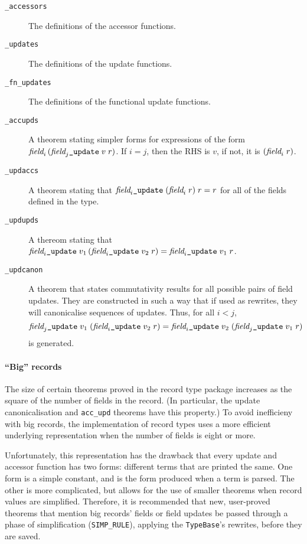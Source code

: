 \begin{description}
\item[\texttt{\_accessors}] The definitions of the accessor functions.
  \rewruse
\item[\texttt{\_updates}] The definitions of the update functions.
  \rewruse
\item[\texttt{\_fn\_updates}] The definitions of the functional update
  functions.
\item[\texttt{\_accupds}] A theorem stating simpler forms for
  expressions of the form $\mbox{\it field}_{i}\, (\mbox{\it field}_{j}\mbox{\tt\_update}\;v\; r)$.  If
  $i = j$, then the RHS is $v$, if not, it is $(\mbox{\it field}_{i}\;r)$.
  \rewruse
\item[\texttt{\_updaccs}] A theorem stating that $\mbox{\it field}_{i}\mbox{\tt\_update}
  \;(\mbox{\it field}_{i}\;r)\;r = r$ for all of
  the fields defined in the type. \rewruse
\item[\texttt{\_updupds}] A thereom stating that $\mbox{\it field}_{i}\mbox{\tt\_update}
  \;v_1 \,(\mbox{\it field}_{i}\mbox{\tt\_update} \;v_2\;r) = \mbox{\it field}_{i}\mbox{\tt\_update}\;v_1\;r$.
  \rewruse
\item[\texttt{\_updcanon}] A theorem that states commutativity results
  for all possible pairs of field updates.  They are constructed in
  such a way that if used as rewrites, they will canonicalise
  sequences of updates. Thus, for all $i < j$, \[
  \mbox{\it field}_{j}\mbox{\tt\_update}\;v_1\;(\mbox{\it field}_{i}\mbox{\tt\_update}\;v_2\;r) =
  \mbox{\it field}_{i}\mbox{\tt\_update}\;v_2\;(\mbox{\it field}_{j}\mbox{\tt\_update}\;v_1\;r)
  \] is generated.
 \rewruse
\end{description}

\paragraph{``Big'' records} The size of certain theorems proved in the
record type package increases as the square of the number of fields in
the record.  (In particular, the update canonicalisation and
\texttt{acc\_upd} theorems have this property.) To avoid inefficieny
with big records, the implementation of record types uses a more
efficient underlying representation when the number of fields is eight
or more.

Unfortunately, this representation has the drawback that every update
and accessor function has two forms: different terms that are printed
the same.  One form is a simple constant, and is the form produced
when a term is parsed.  The other is more complicated, but allows for
the use of smaller theorems when record values are simplified.
Therefore, it is recommended that new, user-proved theorems that
mention big records' fields or field updates be passed through a phase
of simplification (\texttt{SIMP\_RULE}), applying the
\texttt{TypeBase}'s rewrites, before they are saved.


